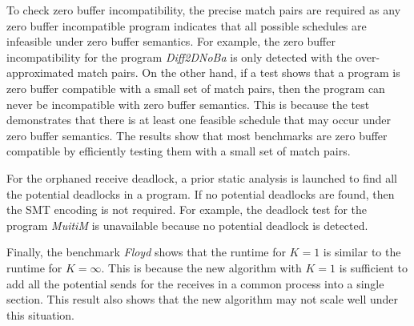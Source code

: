 To check zero buffer incompatibility, the precise match pairs are required as any zero buffer incompatible program indicates that 
all possible schedules are infeasible under zero buffer semantics. For example, the zero buffer incompatibility for the program \textit{Diff2DNoBa} is only detected with the over-approximated match pairs. On the other hand, if a test shows that a program is zero buffer compatible with a small set of match pairs, then the program can never be incompatible with zero buffer semantics. This is because the test demonstrates that there is at least one feasible schedule that may occur under zero buffer semantics. The results show that most benchmarks are zero buffer compatible by efficiently testing them with a small set of match pairs.

For the orphaned receive deadlock, a prior static analysis is launched to find all the potential deadlocks in a program. If no potential deadlocks are found, then the SMT encoding is not required. For example, the deadlock test for the program \textit{MuitiM} is unavailable because no potential deadlock is detected.

Finally, the benchmark \textit{Floyd} shows that the runtime for $K=1$ is similar to the runtime for $K=\infty$. This is because the new algorithm with $K=1$ is sufficient to add all the potential sends for the receives in a common process into a single section. This result also shows that the new algorithm may not scale well under this situation.
